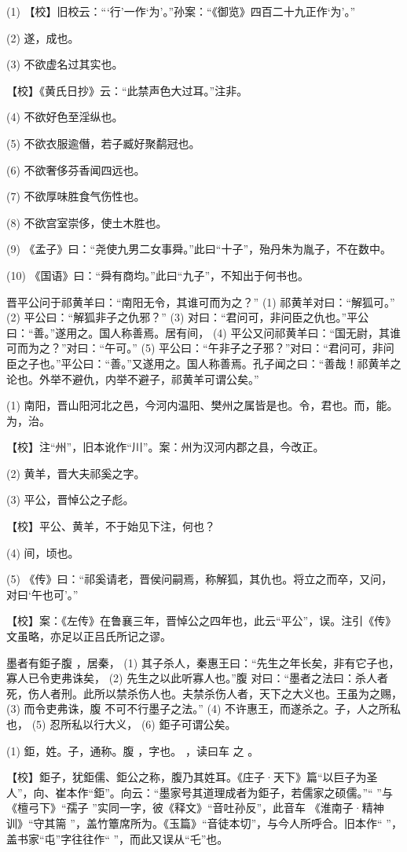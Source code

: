\documentclass[12pt,UTF8]{ctexbook}
\begin{document}
(1) 【校】旧校云：“‘行’一作‘为’。”孙案：“《御览》四百二十九正作‘为’。”

(2) 遂，成也。

(3) 不欲虚名过其实也。

【校】《黄氏日抄》云：“此禁声色大过耳。”注非。

(4) 不欲好色至淫纵也。

(5) 不欲衣服逾僭，若子臧好聚鹬冠也。

(6) 不欲奢侈芬香闻四远也。

(7) 不欲厚味胜食气伤性也。

(8) 不欲宫室崇侈，使土木胜也。

(9) 《孟子》曰：“尧使九男二女事舜。”此曰“十子”，殆丹朱为胤子，不在数中。

(10) 《国语》曰：“舜有商均。”此曰“九子”，不知出于何书也。

晋平公问于祁黄羊曰：“南阳无令，其谁可而为之？” (1) 祁黄羊对曰：“解狐可。” (2) 平公曰：“解狐非子之仇邪？” (3) 对曰：“君问可，非问臣之仇也。”平公曰：“善。”遂用之。国人称善焉。居有间， (4) 平公又问祁黄羊曰：“国无尉，其谁可而为之？”对曰：“午可。” (5) 平公曰：“午非子之子邪？”对曰：“君问可，非问臣之子也。”平公曰：“善。”又遂用之。国人称善焉。孔子闻之曰：“善哉！祁黄羊之论也。外举不避仇，内举不避子，祁黄羊可谓公矣。”

(1) 南阳，晋山阳河北之邑，今河内温阳、樊州之属皆是也。令，君也。而，能。为，治。

【校】注“州”，旧本讹作“川”。案：州为汉河内郡之县，今改正。

(2) 黄羊，晋大夫祁奚之字。

(3) 平公，晋悼公之子彪。

【校】平公、黄羊，不于始见下注，何也？

(4) 间，顷也。

(5) 《传》曰：“祁奚请老，晋侯问嗣焉，称解狐，其仇也。将立之而卒，又问，对曰‘午也可’。”

【校】案：《左传》在鲁襄三年，晋悼公之四年也，此云“平公”，误。注引《传》文虽略，亦足以正吕氏所记之谬。

墨者有鉅子腹 ，居秦， (1) 其子杀人，秦惠王曰：“先生之年长矣，非有它子也，寡人已令吏弗诛矣， (2) 先生之以此听寡人也。”腹 对曰：“墨者之法曰：杀人者死，伤人者刑。此所以禁杀伤人也。夫禁杀伤人者，天下之大义也。王虽为之赐， (3) 而令吏弗诛，腹 不可不行墨子之法。” (4) 不许惠王，而遂杀之。子，人之所私也， (5) 忍所私以行大义， (6) 鉅子可谓公矣。

(1) 鉅，姓。子，通称。腹 ，字也。 ，读曰车 之 。

【校】鉅子，犹鉅儒、鉅公之称，腹乃其姓耳。《庄子·天下》篇“以巨子为圣人”，向、崔本作“鉅”。向云：“墨家号其道理成者为鉅子，若儒家之硕儒。”“ ”与《檀弓下》“孺子 ”实同一字，彼《释文》“音吐孙反”，此音车 《淮南子·精神训》“守其篅 ”，盖竹簟席所为。《玉篇》“音徒本切”，与今人所呼合。旧本作“ ”，盖书家“屯”字往往作“ ”，而此又误从“乇”也。
\end{document}
